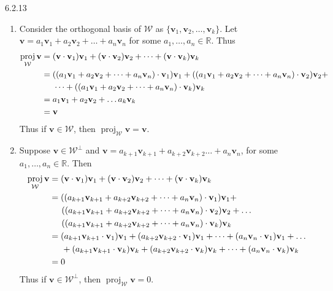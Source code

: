 \documentclass{article}
\theoremstyle{definition}
\DeclareMathOperator{\proj}{proj}
\def\v{\mathbf{v}}
\def\W{\mathcal{W}}
\def\R{\mathbb{R}}
\begin{document}
    \begin{prob}{6.2.13} $ $
        \begin{enumerate}[label=\alph*.)]
            \item Consider the orthogonal basis of $\W$ as $\{ \v_1, \v_2, \dots, \v_k \}$. Let $\v = a_{1}\v_{1} + a_{2}\v_{2} + \dots + a_{n}\v_{n}$ for some $a_{1}, \dots, a_{n} \in \R$. Thus 
            \begin{align*}
                \proj_{\W} \v &= (\v \cdot \v_1) \v_1 + (\v \cdot \v_2) \v_2 + \dots + (\v \cdot \v_k) \v_k \\
                &= ((a_{1}\v_{1} + a_{2}\v_{2} + \dots + a_{n}\v_{n}) \cdot \v_1) \v_1 + ((a_{1}\v_{1} + a_{2}\v_{2} + \dots + a_{n}\v_{n}) \cdot \v_2) \v_2 + \\
                &\hspace{0.5cm}\dots + ((a_{1}\v_{1} + a_{2}\v_{2} + \dots + a_{n}\v_{n}) \cdot \v_k) \v_k \\
                &= a_1\v_1 + a_2\v_2 + \dots a_k\v_k \\
                &= \v
            \end{align*}
            Thus if $\v \in \W$, then $\proj _{\W} \v = \v$.

            \item Suppose $\v \in \W^{\perp}$ and $\v = a_{k+1}\v_{k+1} + a_{k+2}\v_{k+2} \dots + a_{n}\v_{n}$, for some $a_{1}, \dots , a_{n} \in \R$. Then 
            \begin{align*}
                \proj_{\W} \v &= (\v \cdot \v_1)\v_1 + (\v \cdot \v_2)\v_2 + \dots + (\v \cdot \v_k)\v_k \\
                &= ((a_{k+1}\v_{k+1} + a_{k+2}\v_{k+2} + \dots + a_n\v_n) \cdot \v_1) \v_1 + \\
                &\hspace{0.5cm} ((a_{k+1}\v_{k+1} + a_{k+2}\v_{k+2} + \dots + a_n\v_n) \cdot \v_2) \v_2 + \dots  \\
                &\hspace{0.5cm} ((a_{k+1}\v_{k+1} + a_{k+2}\v_{k+2} + \dots + a_n\v_n) \cdot \v_k) \v_k \\
                &= (a_{k+1}\v_{k+1} \cdot \v_1) \v_1 + (a_{k+2}\v_{k+2} \cdot \v_1) \v_1 + \dots + (a_{n}\v_{n} \cdot \v_1) \v_1 + \dots \\
                &\hspace{0.5cm} + (a_{k+1}\v_{k+1} \cdot \v_k) \v_k + (a_{k+2}\v_{k+2} \cdot \v_k) \v_k + \dots + (a_{n}\v_{n} \cdot \v_k) \v_k \\
                &= 0
            \end{align*}
            Thus if $\v \in \W^{\perp}$, then $\proj_{\W} \v = 0$.
        \end{enumerate}
        $ $
    \end{prob}
\end{document}
